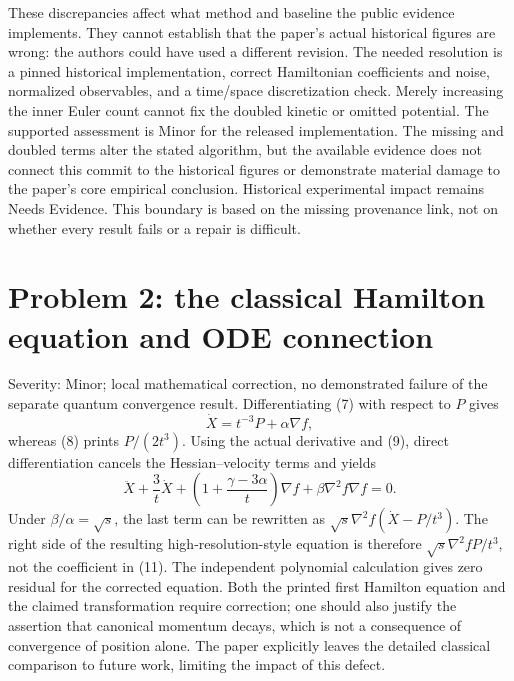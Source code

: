 \documentclass[10pt]{article}
\begin{document}
These discrepancies affect what method and baseline the public evidence implements. They cannot establish that the paper’s actual historical figures are wrong: the authors could have used a different revision. The needed resolution is a pinned historical implementation, correct Hamiltonian coefficients and noise, normalized observables, and a time/space discretization check. Merely increasing the inner Euler count cannot fix the doubled kinetic or omitted potential. The supported assessment is Minor for the released implementation. The missing and doubled terms alter the stated algorithm, but the available evidence does not connect this commit to the historical figures or demonstrate material damage to the paper’s core empirical conclusion. Historical experimental impact remains Needs Evidence. This boundary is based on the missing provenance link, not on whether every result fails or a repair is difficult.\par
\section*{Problem 2: the classical Hamilton equation and ODE connection}
Severity: Minor; local mathematical correction, no demonstrated failure of the separate quantum convergence result. Differentiating (7) with respect to \(P\) gives \[\dot X=t^{-3}P+\alpha\nabla f,\] whereas (8) prints \(P/(2t^3)\). Using the actual derivative and (9), direct differentiation cancels the Hessian–velocity terms and yields \[\ddot X+\frac3t\dot X+
 \left(1+\frac{\gamma-3\alpha}{t}\right)\nabla f
 +\beta\nabla^2 f\nabla f=0.\] Under \(\beta/\alpha=\sqrt{s}\), the last term can be rewritten as \(\sqrt{s}\nabla^2f(\dot X-P/t^3)\). The right side of the resulting high-resolution-style equation is therefore \(\sqrt{s}\nabla^2fP/t^3\), not the coefficient in (11). The independent polynomial calculation gives zero residual for the corrected equation. Both the printed first Hamilton equation and the claimed transformation require correction; one should also justify the assertion that canonical momentum decays, which is not a consequence of convergence of position alone. The paper explicitly leaves the detailed classical comparison to future work, limiting the impact of this defect.\par
\end{document}
